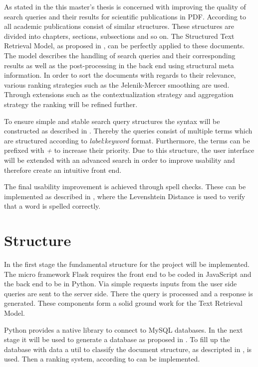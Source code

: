 \documentclass[a4paper, 12pt]{scrartcl}
\begin{document}
As stated in the  this master's thesis is concerned with improving the quality of search queries and their results for scientific
publications in PDF. According to \cite{KGJK14} all academic publications consist of similar structures. These structures are divided into chapters,
sections, subsections and so on. The Structured Text Retrieval Model, as proposed in \cite{RNBY99}, can be perfectly applied to these documents.
The model describes the handling of search queries and their corresponding results as well as the post-processing in the back end using structural meta information. 
In order to sort the documents with regards to their relevance, various ranking strategies such as the Jelenik-Mercer smoothing are used. Through extensions such as the 
contextualization strategy and aggregation strategy the ranking will be refined further.

To ensure simple and stable search query structures the syntax will be constructed as described in \cite{Coh03}. Thereby the queries consist of multiple terms
which are structured according to \textit{label}:\textit{keyword} format. Furthermore, the terms can be prefixed with \textit{+} to increase their priority. Due to
this structure, the user interface will be extended with an advanced search in order to improve usability and therefore create an intuitive front end.

The final usability improvement is achieved through spell checks. These can be implemented as described in \cite{SPCB13}, where the Levenshtein Distance is used to verify 
that a word is spelled correctly.

\section{Structure}

In the first stage the fundamental structure for the project will be implemented. The micro framework Flask requires the front end to be coded in JavaScript and the back end to be in Python.  %
Via simple requests inputs from the user side queries are sent to the server side. There the query is processed and a response is generated. These components form a solid ground work 
for the Text Retrieval Model.

Python provides a native library to connect to MySQL databases. In the next stage it will be used to generate a database as proposed in \cite{YA94}. To fill up the database with data a util to classify 
the document structure, as descripted in \cite{KGJK14}, is used. Then a ranking system, according to \cite{MRS08, RNBY99} can be implemented.
\end{document}
